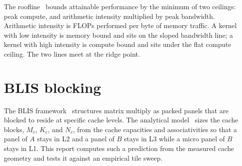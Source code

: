 The roofline~\cite{williams2009} bounds attainable performance by the minimum of
two ceilings: peak compute, and arithmetic intensity multiplied by peak
bandwidth. Arithmetic intensity is FLOPs performed per byte of memory traffic. A
kernel with low intensity is memory bound and sits on the sloped bandwidth line;
a kernel with high intensity is compute bound and sits under the flat compute
ceiling. The two lines meet at the ridge point.

\section{BLIS blocking}

The BLIS framework~\cite{vanzee2015} structures matrix multiply as packed panels
that are blocked to reside at specific cache levels. The analytical
model~\cite{low2016} sizes the cache blocks, $M_c$, $K_c$, and $N_c$, from the
cache capacities and associativities so that a panel of $A$ stays in L2 and a
panel of $B$ stays in L3 while a micro panel of $B$ stays in L1. This report
computes such a prediction from the measured cache geometry and tests it against
an empirical tile sweep.
